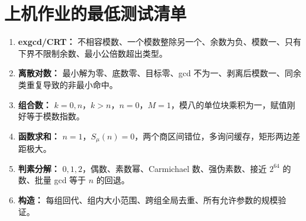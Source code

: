 \documentclass[UTF8,a4paper,11pt,twoside,openright,fontset=fandol]{ctexbook}
\theoremstyle{definition}
\begin{document}
\section{上机作业的最低测试清单}
\begin{enumerate}
\item \textbf{exgcd/CRT：} 不相容模数、一个模数整除另一个、余数为负、模数一、只有下界不限制余数、最小公倍数超出类型。
\item \textbf{离散对数：} 最小解为零、底数零、目标零、gcd 不为一、剥离后模数一、同余类重复导致的非最小命中。
\item \textbf{组合数：} $k=0,n$，$k>n$，$n=0$，$M=1$，模八的单位块乘积为一，赋值刚好等于模数指数。
\item \textbf{函数求和：} $n=1$，$S_\mu(n)=0$，两个商区间错位，多询问缓存，矩形两边差距极大。
\item \textbf{判素分解：} $0,1,2$，偶数、素数幂、Carmichael 数、强伪素数、接近 $2^{64}$ 的数、批量 gcd 等于 $n$ 的回退。
\item \textbf{构造：} 每组回代、组内大小范围、跨组全局去重、所有允许参数的规模验证。
\end{enumerate}

\end{document}
